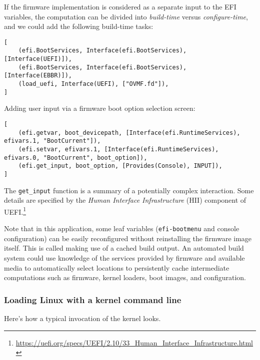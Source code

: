 %
If the firmware implementation is considered as a separate input to the EFI variables, the computation can be divided into \emph{build-time} versus \emph{configure-time}, and we could add the following build-time tasks:
\begin{verbatim}
[
    (efi.BootServices, Interface(efi.BootServices), [Interface(UEFI)]),
    (efi.BootServices, Interface(efi.BootServices), [Interface(EBBR)]),
    (load_uefi, Interface(UEFI), ["OVMF.fd"]),
]
\end{verbatim}

Adding user input via a firmware boot option selection screen:
\begin{verbatim}
[
    (efi.getvar, boot_devicepath, [Interface(efi.RuntimeServices), efivars.1, "BootCurrent"]),
    (efi.setvar, efivars.1, [Interface(efi.RuntimeServices), efivars.0, "BootCurrent", boot_option]),
    (efi.get_input, boot_option, [Provides(Console), INPUT]),
]
\end{verbatim}
The \texttt{get\_input} function is a summary of a potentially complex interaction.
%
Some details are specified by the \emph{Human Interface Infrastructure} (HII) component of UEFI.\footnote{\url{https://uefi.org/specs/UEFI/2.10/33_Human_Interface_Infrastructure.html}}


Note that in this application, some leaf variables (\texttt{efi-bootmenu} and console configuration) can be easily
reconfigured without reinstalling the firmware image itself. 
%
This is called making use of a cached build output.
%
An automated build system could use knowledge of the services provided by firmware and available media to automatically select locations to persistently cache intermediate computations such as firmware, kernel loaders, boot images, and configuration.

\subsubsection{Loading Linux with a kernel command line}

Here's how a typical invocation of the kernel looks.

